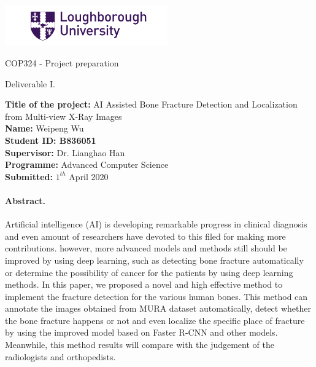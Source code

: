\documentclass[12pt,oneside,a4paper]{article}
\newcommand*{\makeTitleParagraph}{
\begingroup
\begin{center}
\includegraphics[width = 7cm]{LoughboroughLogo.png} \par
COP324 - Project preparation\par
Deliverable I. \par
\end{center}

 
\noindent


\noindent
\textbf{Title of the project:} AI Assisted Bone Fracture Detection and Localization from Multi-view X-Ray Images\\ 
\textbf{Name:} Weipeng Wu\\
\textbf{Student ID: B836051}\\
\textbf{Supervisor:} Dr. Lianghao Han\\
\textbf{Programme:} Advanced Computer Science\\
\textbf{Submitted:} $1^{th}$ April 2020\\
\endgroup}
\begin{document}
\makeTitleParagraph %

\paragraph{Abstract.} Artificial intelligence (AI) is developing remarkable progress in clinical diagnosis and even amount of researchers have devoted to this filed for making more contributions. however, more advanced models and methods still should be improved by using deep learning, such as detecting bone fracture automatically or determine the possibility of cancer for the patients by using deep learning methods. In this paper, we proposed a novel and high effective method to implement the fracture detection for the various human bones. This method can annotate the images obtained from MURA dataset automatically, detect whether the bone fracture happens or not and even localize the specific place of fracture by using the improved model based on Faster R-CNN and other models. Meanwhile, this method results will compare with the judgement of the radiologists and orthopedists.
\end{document}
